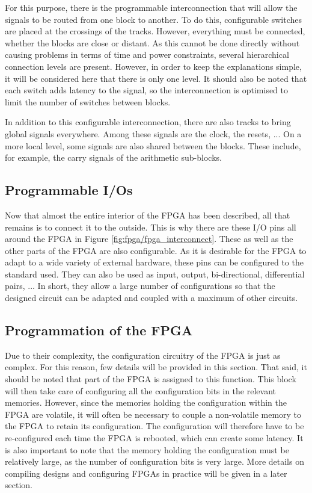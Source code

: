 For this purpose, there is the programmable interconnection that will allow the signals to be routed 
from one block to another. To do this, configurable switches are placed at the crossings of the 
tracks. However, everything must be connected, whether the blocks are close or distant. As this 
cannot be done directly without causing problems in terms of time and power constraints, several 
hierarchical connection levels are present. However, in order to keep the explanations simple, it 
will be considered here that there is only one level. It should also be noted that each switch adds 
latency to the signal, so the interconnection is optimised to limit the number of switches between 
blocks. 

In addition to this configurable interconnection, there are also tracks to bring global signals 
everywhere. Among these signals are the clock, the resets, ... On a more local level, some signals 
are also shared between the blocks. These include, for example, the carry signals of the arithmetic 
sub-blocks.

\subsection{Programmable I/Os}

Now that almost the entire interior of the FPGA has been described, all that remains is to connect 
it to the outside. This is why there are these I/O pins all around the FPGA in Figure 
\ref{fig:fpga/fpga_interconnect}. These as well as the other parts of the FPGA are also 
configurable. As it is desirable for the FPGA to adapt to a wide variety of external hardware, these 
pins can be configured to the standard used. They can also be used as input, output, bi-directional, 
differential pairs, ... In short, they allow a large number of configurations so that the designed 
circuit can be adapted and coupled with a maximum of other circuits.

\subsection{Programmation of the FPGA}

Due to their complexity, the configuration circuitry of the FPGA is just as complex. For this 
reason, few details will be provided in this section. That said, it should be noted that part of 
the FPGA is assigned to this function. This block will then take care of configuring all the 
configuration bits in the relevant memories. However, since the memories holding the configuration 
within the FPGA are volatile, it will often be necessary to couple a non-volatile memory to the 
FPGA to retain its configuration. The configuration will therefore have to be re-configured each 
time the FPGA is rebooted, which can create some latency. It is also important to note that the 
memory holding the configuration must be relatively large, as the number of configuration bits is 
very large. More details on compiling designs and configuring FPGAs in practice will be given in a 
later section.

